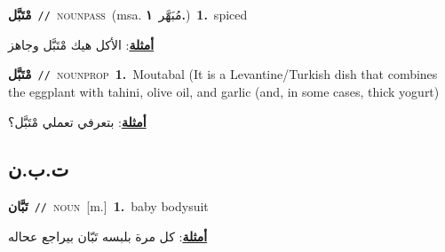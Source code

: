 \documentclass[10pt,a4paper,twoside]{article} %
\begin{document}
\begin{multicols}{2}
{{\setlength\topsep{0pt}\textbf{\foreignlanguage{arabic}{مْتَبَّل}}\ {\color{gray}\texttt{//}\color{black}}\ \textsc{noun\textunderscore pass}\ \color{gray}(msa. \foreignlanguage{arabic}{مُبَهَّر}~\foreignlanguage{arabic}{\textbf{١.}})\color{black}\ \textbf{1.}~spiced\  \begin{flushright}\color{gray}\foreignlanguage{arabic}{\textbf{\underline{\foreignlanguage{arabic}{أمثلة}}}: الأكل هيك مْتَبَّل وجاهز}\end{flushright}\color{black}} \vspace{2mm}

{\setlength\topsep{0pt}\textbf{\foreignlanguage{arabic}{مْتَبَّل}}\ {\color{gray}\texttt{//}\color{black}}\ \textsc{noun\textunderscore prop}\ \textbf{1.}~Moutabal (It is a Levantine/Turkish dish that combines the eggplant with tahini, olive oil, and garlic (and, in some cases, thick yogurt)\  \begin{flushright}\color{gray}\foreignlanguage{arabic}{\textbf{\underline{\foreignlanguage{arabic}{أمثلة}}}: بتعرفي تعملي مْتَبَّل؟}\end{flushright}\color{black}} \vspace{2mm}

\vspace{-3mm}
\subsection*{\color{blue}\foreignlanguage{arabic}{ت.ب.ن}\color{blue}{}} 

{\setlength\topsep{0pt}\textbf{\foreignlanguage{arabic}{تَبَّان}}\ {\color{gray}\texttt{//}\color{black}}\ \textsc{noun}\ [m.]\ \textbf{1.}~baby bodysuit\  \begin{flushright}\color{gray}\foreignlanguage{arabic}{\textbf{\underline{\foreignlanguage{arabic}{أمثلة}}}: كل مرة بلبسه تَبّان بيراجع عحاله}\end{flushright}\color{black}} \vspace{2mm}

}
\end{multicols}
\end{document}
